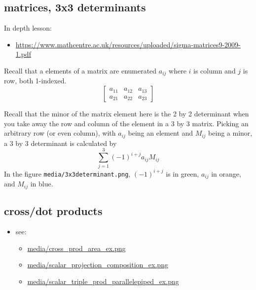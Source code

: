 \documentclass[11pt]{article}
\theoremstyle{definition}
\begin{document}
\subsection*{matrices, 3x3 determinants}
In depth lesson:
\begin{itemize}
  \item \url{https://www.mathcentre.ac.uk/resources/uploaded/sigma-matrices9-2009-1.pdf}
\end{itemize}

Recall that a elements of a matrix are enumerated $a_{ij}$ where $i$ is column and $j$ is row, both 1-indexed. 
\[\begin{bmatrix}
  a_{11} & a_{12} & a_{13}\\
  a_{21} & a_{22} & a_{23}
\end{bmatrix}\]

Recall that the minor of the matrix element here is the 2 by 2 determinant when you take away the row and column of the element in a 3 by 3 matrix.  Picking an arbitrary row (or even column), with $a_{ij}$ being an element and $M_{ij}$ being a minor, a 3 by 3 determinant is calculated by 
\[ \sum_{j=1}^{3} (-1)^{i+j} a_{ij} M_{ij} \]
In the figure \texttt{media/3x3determinant.png}, $(-1)^{i+j}$ is in green, $a_{ij}$ in orange, and $M_{ij}$ in blue.

\subsection*{cross/dot products}
\begin{itemize}
  \item see:
  \begin{itemize}
    \item \url{media/cross_prod_area_ex.png}
    \item \url{media/scalar_projection_composition_ex.png}
    \item \url{media/scalar_triple_prod_parallelepiped_ex.png}
  \end{itemize}
\end{itemize}






\end{document}
